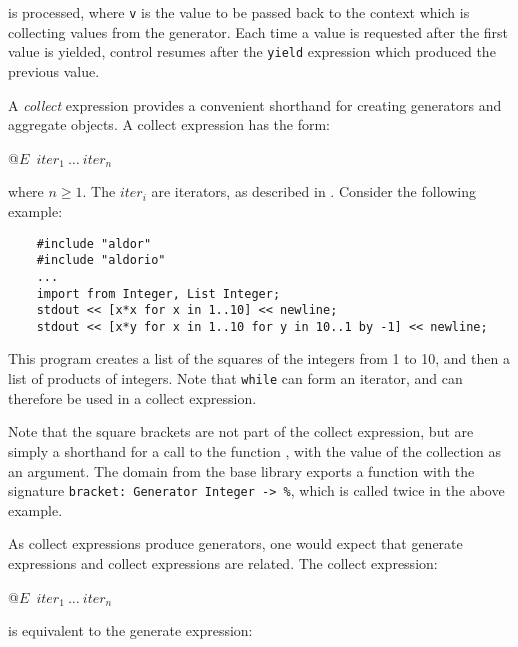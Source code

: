 is processed, where {\tt v} is the value to be passed back to the
context which is collecting values from the generator.  Each time a
value is requested after the first value is yielded, control resumes
after the {\tt yield} expression which produced the previous value.



A {\em collect} expression provides a convenient shorthand for
creating generators and aggregate objects.  A collect expression
has the form:

\verb@   @{\tt $E$\ ${iter}_1\ \ldots\ {iter}_n$}

where $n \ge 1$. The ${iter}_i$ are iterators, as described in
.  Consider the following example:

\begin{small}
\begin{verbatim}
    #include "aldor"
    #include "aldorio"
    ...
    import from Integer, List Integer;
    stdout << [x*x for x in 1..10] << newline;
    stdout << [x*y for x in 1..10 for y in 10..1 by -1] << newline;
\end{verbatim}
\end{small}

This program creates a list of the squares of the integers from 1 to 10,
and then a list of products of integers.  Note that {\tt while} can form
an iterator, and can therefore be used in a collect expression.

\begin{sloppypar}
Note that the square brackets are not part of the collect expression,
but are simply a shorthand for a call to the function ,
with the value of the collection as an argument.  The domain
 from the \asharp{} base library exports a
function with the signature
\verb"bracket: Generator Integer -> %", which is called twice in the
above example.
\end{sloppypar}

As collect expressions produce generators, one would expect that
generate expressions and collect expressions are related.  The collect
expression:

\verb@   @{\tt $E$\ ${iter}_1\ \ldots\ {iter}_n$}

is equivalent to the generate expression:

